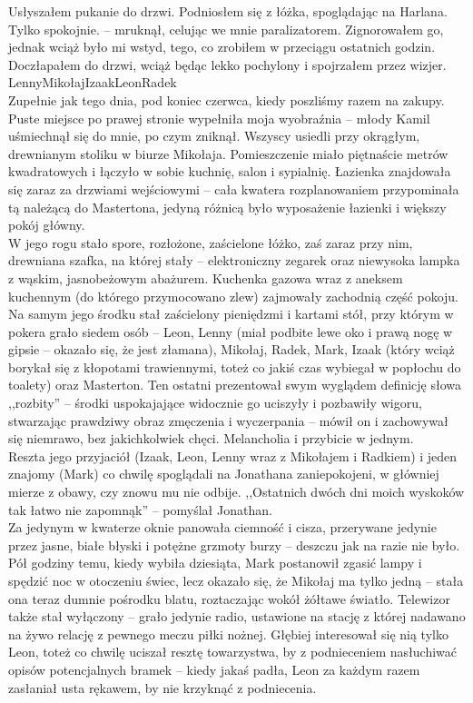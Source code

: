 \documentclass[../MAIN.tex]{subfiles}
\begin{document}
Usłyszałem pukanie do drzwi. Podniosłem się z łóżka, spoglądając na Harlana.
\sx Tylko spokojnie. -- mruknął, celując we mnie paralizatorem. \qd
Zignorowałem go, jednak wciąż było mi wstyd, tego, co zrobiłem w przeciągu ostatnich godzin. Doczłapałem do drzwi, wciąż będąc lekko pochylony i spojrzałem przez wizjer.\\
Lenny\dotfill Mikołaj\dotfill Izaak\dotfill Leon\dotfill Radek\\
Zupełnie jak tego dnia, pod koniec czerwca, kiedy poszliśmy razem na zakupy. Puste miejsce po prawej stronie wypełniła moja wyobraźnia -- młody Kamil uśmiechnął się do mnie, po czym zniknął.
% 
% 
Wszyscy usiedli przy okrągłym, drewnianym stoliku w biurze Mikołaja. Pomieszczenie miało piętnaście metrów kwadratowych i łączyło w sobie kuchnię, salon i sypialnię. Łazienka znajdowała się zaraz za drzwiami wejściowymi -- cała kwatera rozplanowaniem przypominała tą należącą do Mastertona, jedyną różnicą było wyposażenie łazienki i większy pokój główny.\\
W jego rogu stało spore, rozłożone, zaścielone łóżko, zaś zaraz przy nim, drewniana szafka, na której stały -- elektroniczny zegarek oraz niewysoka lampka z wąskim, jasnobeżowym abażurem. Kuchenka gazowa wraz z aneksem kuchennym (do którego przymocowano zlew) zajmowały zachodnią część pokoju. Na samym jego środku stał zaścielony pieniędzmi i kartami stół, przy którym w pokera grało siedem osób -- Leon, Lenny (miał podbite lewe oko i prawą nogę w gipsie -- okazało się, że jest złamana), Mikołaj, Radek, Mark, Izaak (który wciąż borykał się z kłopotami trawiennymi, toteż co jakiś czas wybiegał w popłochu do toalety) oraz Masterton. Ten ostatni prezentował swym wyglądem definicję słowa ,,rozbity'' -- środki uspokajające widocznie go uciszyły i pozbawiły wigoru, stwarzając prawdziwy obraz zmęczenia i wyczerpania -- mówił on i zachowywał się niemrawo, bez jakichkolwiek chęci. Melancholia i przybicie w jednym.\\
Reszta jego przyjaciół (Izaak, Leon, Lenny wraz z Mikołajem i Radkiem) i jeden znajomy (Mark) co chwilę spoglądali na Jonathana zaniepokojeni, w główniej mierze z obawy, czy znowu mu nie odbije. ,,Ostatnich dwóch dni moich wyskoków tak łatwo nie zapomną\3k'' -- pomyślał Jonathan.\\
Za jedynym w kwaterze oknie panowała ciemność i cisza, przerywane jedynie przez jasne, białe błyski i potężne grzmoty burzy -- deszczu jak na razie nie było. Pół godziny temu, kiedy wybiła dziesiąta, Mark postanowił zgasić lampy i spędzić noc w otoczeniu świec, lecz okazało się, że Mikołaj ma tylko jedną -- stała ona teraz dumnie pośrodku blatu, roztaczając wokół żółtawe światło. Telewizor także stał wyłączony -- grało jedynie radio, ustawione na stację z której nadawano na żywo relację z pewnego meczu piłki nożnej. Głębiej interesował się nią tylko Leon, toteż co chwilę uciszał resztę towarzystwa, by z podnieceniem nasłuchiwać opisów potencjalnych bramek -- kiedy jakaś padła, Leon za każdym razem zasłaniał usta rękawem, by nie krzyknąć z podniecenia.
\end{document}
